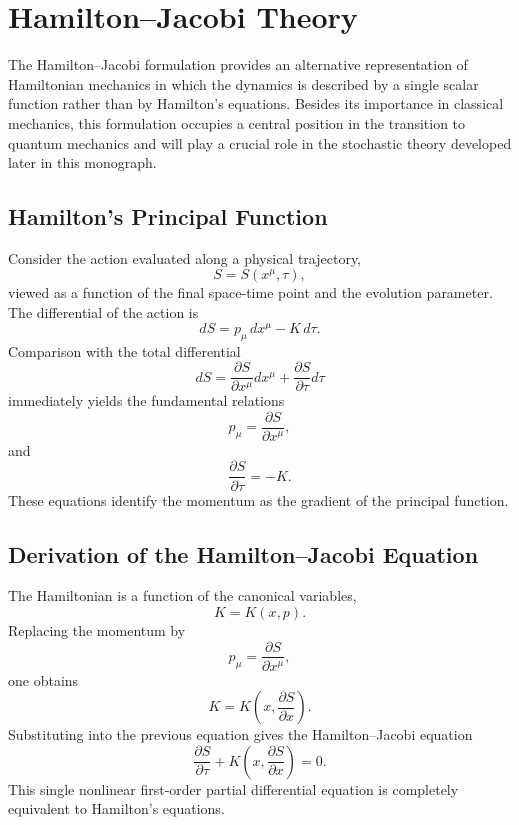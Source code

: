 \section{Hamilton--Jacobi Theory}
The Hamilton--Jacobi formulation provides an alternative representation
of Hamiltonian mechanics in which the dynamics is described by a single
scalar function rather than by Hamilton's equations. Besides its
importance in classical mechanics, this formulation occupies a central
position in the transition to quantum mechanics and will play a crucial
role in the stochastic theory developed later in this monograph.
\subsection{Hamilton's Principal Function}
Consider the action evaluated along a physical trajectory,
\[S=S(x^\mu,\tau),\]
viewed as a function of the final space-time point and the evolution
parameter.
The differential of the action is
\[dS=p_\mu\,dx^\mu-K\,d\tau.\]
Comparison with the total differential
\[dS=\frac{\partial S}{\partial x^\mu}dx^\mu+\frac{\partial S}{\partial\tau}d\tau\]
immediately yields the fundamental relations
\[\boxed{p_\mu=\frac{\partial S}{\partial x^\mu},}\]
and
\[\boxed{\frac{\partial S}{\partial\tau}=-K.}\]
These equations identify the momentum as the gradient of the principal
function.
\subsection{Derivation of the Hamilton--Jacobi Equation}
The Hamiltonian is a function of the canonical variables,
\[K=K(x,p).\]
Replacing the momentum by
\[p_\mu=\frac{\partial S}{\partial x^\mu},\]
one obtains
\[K=K\left(x,\frac{\partial S}{\partial x}\right).\]
Substituting into the previous equation gives the Hamilton--Jacobi
equation
\[\boxed{\frac{\partial S}{\partial\tau}+
K\left(x,\frac{\partial S}{\partial x}\right)=0.}\]
This single nonlinear first-order partial differential equation is
completely equivalent to Hamilton's equations.
